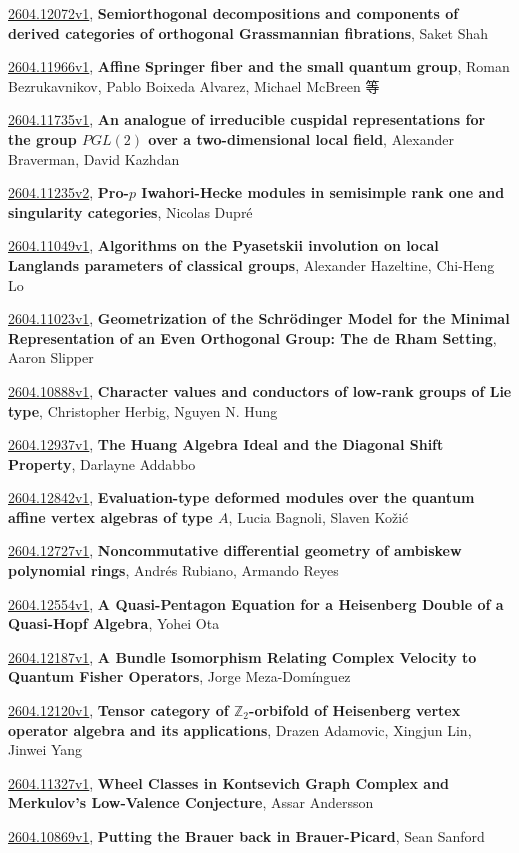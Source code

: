 \documentclass[9pt, a4paper]{article}
\theoremstyle{plain}
\theoremstyle{definition}
\theoremstyle{remark}
\newcommand{\arxiv}[3]{\href{https://arxiv.org/abs/#1}{#1}, \textbf{\textcolor{arxivblue}{#2}}, #3}
\begin{document}
\arxiv{2604.12072v1}{Semiorthogonal decompositions and components of derived categories of orthogonal Grassmannian fibrations}{Saket Shah}

\arxiv{2604.11966v1}{Affine Springer fiber and the small quantum group}{Roman Bezrukavnikov, Pablo Boixeda Alvarez, Michael McBreen 等}

\arxiv{2604.11735v1}{An analogue of irreducible cuspidal representations for the group $PGL(2)$ over a two-dimensional local field}{Alexander Braverman, David Kazhdan}

\arxiv{2604.11235v2}{Pro-$p$ Iwahori-Hecke modules in semisimple rank one and singularity categories}{Nicolas Dupré}

\arxiv{2604.11049v1}{Algorithms on the Pyasetskii involution on local Langlands parameters of classical groups}{Alexander Hazeltine, Chi-Heng Lo}

\arxiv{2604.11023v1}{Geometrization of the Schrödinger Model for the Minimal Representation of an Even Orthogonal Group: The de Rham Setting}{Aaron Slipper}

\arxiv{2604.10888v1}{Character values and conductors of low-rank groups of Lie type}{Christopher Herbig, Nguyen N. Hung}

\arxiv{2604.12937v1}{The Huang Algebra Ideal and the Diagonal Shift Property}{Darlayne Addabbo}

\arxiv{2604.12842v1}{Evaluation-type deformed modules over the quantum affine vertex algebras of type $A$}{Lucia Bagnoli, Slaven Kožić}

\arxiv{2604.12727v1}{Noncommutative differential geometry of ambiskew polynomial rings}{Andrés Rubiano, Armando Reyes}

\arxiv{2604.12554v1}{A Quasi-Pentagon Equation for a Heisenberg Double of a Quasi-Hopf Algebra}{Yohei Ota}

\arxiv{2604.12187v1}{A Bundle Isomorphism Relating Complex Velocity to Quantum Fisher Operators}{Jorge Meza-Domínguez}

\arxiv{2604.12120v1}{Tensor category of $\mathbb{Z}_2$-orbifold of Heisenberg vertex operator algebra and its applications}{Drazen Adamovic, Xingjun Lin, Jinwei Yang}

\arxiv{2604.11327v1}{Wheel Classes in Kontsevich Graph Complex and Merkulov's Low-Valence Conjecture}{Assar Andersson}

\arxiv{2604.10869v1}{Putting the Brauer back in Brauer-Picard}{Sean Sanford}

\end{document}
